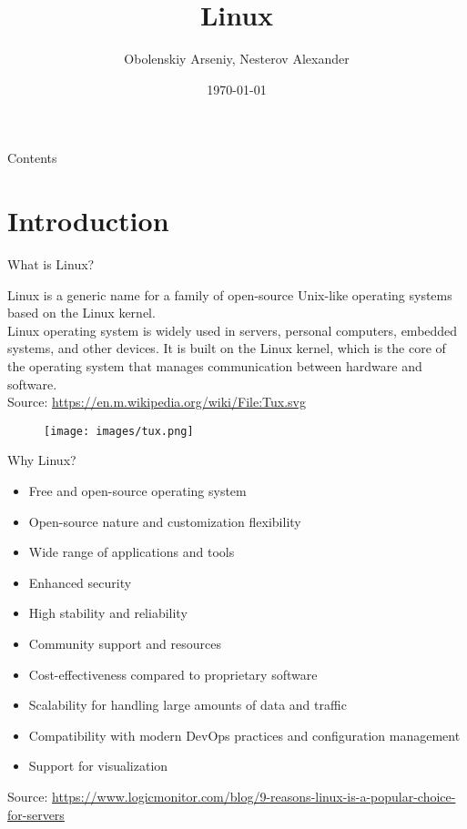 \documentclass{beamer}
\title[Linux]{Linux}
\author{Obolenskiy Arseniy, Nesterov Alexander}
\institute{ITLab}
\date{\today}
\begin{document}
\begin{frame}
    \titlepage%
\end{frame}

\begin{frame}{Contents}
    \tableofcontents
\end{frame}

\section{Introduction}


\begin{frame}{What is Linux?}
  \begin{minipage}[t]{0.6\textwidth}
    Linux is a generic name for a family of open-source Unix-like operating systems based on the Linux kernel. \\
    Linux operating system is widely used in servers, personal computers, embedded systems, and other devices. It is built on the Linux kernel, which is the core of the operating system that manages communication between hardware and software.
    \vspace{10pt}
    \\
    \footnotesize Source: \href{https://en.m.wikipedia.org/wiki/File:Tux.svg}{https://en.m.wikipedia.org/wiki/File:Tux.svg}
  \end{minipage}
  \hfill
  \begin{minipage}[t]{0.35\textwidth}
    \begin{figure}[h]
      \texttt{[image: images/tux.png]}
    \end{figure}
  \end{minipage}
\end{frame}

\begin{frame}{Why Linux?}
  \begin{itemize}
    \item Free and open-source operating system
    \item Open-source nature and customization flexibility
    \item Wide range of applications and tools
    \item Enhanced security
    \item High stability and reliability
    \item Community support and resources
    \item Cost-effectiveness compared to proprietary software
    \item Scalability for handling large amounts of data and traffic
    \item Compatibility with modern DevOps practices and configuration management
    \item Support for visualization
  \end{itemize}

  \footnotesize Source: \href{https://www.logicmonitor.com/blog/9-reasons-linux-is-a-popular-choice-for-servers}{https://www.logicmonitor.com/blog/9-reasons-linux-is-a-popular-choice-for-servers}
\end{frame}
\end{document}
